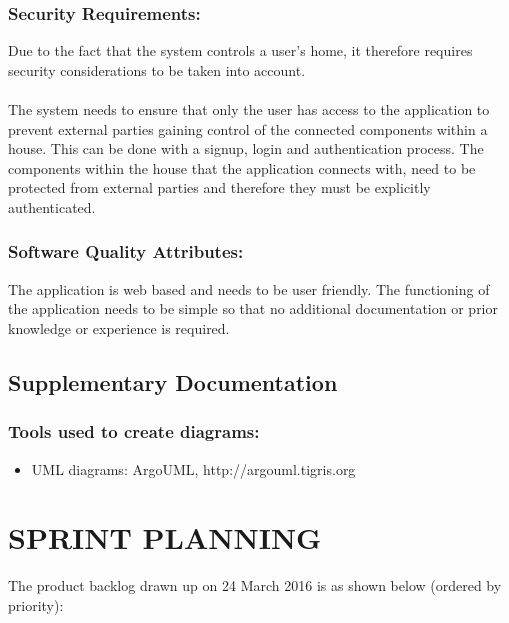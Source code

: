 \documentclass[10pt,twocolumn]{witseiepaper}
\begin{document}
	\subsubsection{Security Requirements:}
	Due to the fact that the system controls a user's home, it therefore requires security considerations to be taken into account.
	\\\\
	The system needs to ensure that only the user has access to the application to prevent external parties gaining control of the connected components within a house. This can be done with a signup, login and authentication process. 
	The components within the house that the application connects with, need to be protected from external parties and therefore they must be explicitly authenticated. 
	
	\subsubsection{Software Quality Attributes:}
	The application is web based and needs to be user friendly. The functioning of the application needs to be simple so that no additional documentation or prior knowledge or experience is required. 
	
	\subsection{Supplementary Documentation}
	\subsubsection{Tools used to create diagrams:}
	\begin{itemize}
		\item UML diagrams: ArgoUML, http://argouml.tigris.org
	\end{itemize}
	
	\section{SPRINT PLANNING}
	
	The product backlog drawn up on 24 March 2016 is as shown below (ordered by priority):
	
\end{document}
